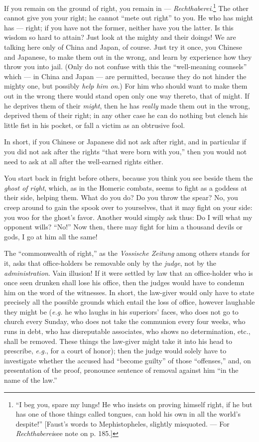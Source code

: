 If you remain on the ground of right, you remain in --- \textit{Rechthaberei}.\footnote{``I beg you, spare my lungs! He who insists 
on proving himself right, if he but has one of those things called tongues, 
can hold his own in all the world's despite!'' [Faust's words to 
Mephistopheles, slightly misquoted. --- For \textit{Rechthaberei}see note on p. 
185.]} The other cannot give you your right; he cannot ``mete out right'' to 
you. He who has might has --- right; if you have not the former, neither have 
you the latter. Is this wisdom so hard to attain? Just look at the mighty and 
their doings! We are talking here only of China and Japan, of course. Just try 
it once, you Chinese and Japanese, to make them out in the wrong, and learn by 
experience how they throw you into jail. (Only do not confuse with this the 
``well-meaning counsels'' which --- in China and Japan --- are permitted, 
because they do not hinder the mighty one, but possibly \textit{help him on}.) 
For him who should want to make them out in the wrong there would stand open 
only one way thereto, that of might. If he deprives them of their 
\textit{might}, then he has \textit{really} made them out in the wrong, 
deprived them of their right; in any other case he can do nothing but clench 
his little fist in his pocket, or fall a victim as an obtrusive fool.

In short, if you Chinese or Japanese did not ask after right, and in 
particular if you did not ask after the rights ``that were born with you,'' 
then you would not need to ask at all after the well-earned rights either.

You start back in fright before others, because you think you see beside them 
the \textit{ghost of right}, which, as in the Homeric combats, seems to fight 
as a goddess at their side, helping them. What do you do? Do you throw the 
spear? No, you creep around to gain the spook over to yourselves, that it may 
fight on your side: you woo for the ghost's favor. Another would simply ask 
thus: Do I will what my opponent wills? ``No!'' Now then, there may fight 
for him a thousand devils or gods, I go at him all the same!

The ``commonwealth of right,'' as the \textit{Vossische Zeitung} among 
others stands for it, asks that office-holders be removable only by the 
\textit{judge}, not by the \textit{administration}. Vain illusion! If it were 
settled by law that an office-holder who is once seen drunken shall lose his 
office, then the judges would have to condemn him on the word of the 
witnesses. In short, the law-giver would only have to state precisely all the 
possible grounds which entail the loss of office, however laughable they might 
be (\textit{e.g.} he who laughs in his superiors' faces, who does not go to 
church every Sunday, who does not take the communion every four weeks, who 
runs in debt, who has disreputable associates, who shows no determination, 
etc., shall be removed. These things the law-giver might take it into his head 
to prescribe, \textit{e.g.}, for a court of honor); then the judge would 
solely have to investigate whether the accused had ``become guilty'' of 
those ``offenses,'' and, on presentation of the proof, pronounce sentence of 
removal against him ``in the name of the law.''


